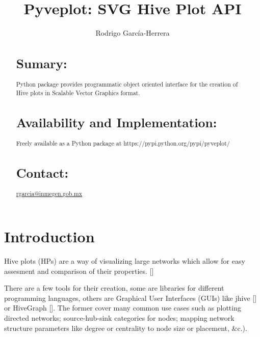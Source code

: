 \documentclass{bioinfo}
\begin{document}

\title[short Title]{Pyveplot: SVG Hive Plot API}
\author[]{Rodrigo Garc\'ia-Herrera}
\address{Department of Bioinformatics, National Institute of Genomic
  Medicine, Periferico Sur 4809, Mexico City 14610}



\maketitle

\begin{abstract}

\section{Sumary:}
Python package provides programmatic object oriented interface for the
creation of Hive plots in Scalable Vector Graphics format.
\section{Availability and Implementation:}
Freely available as a Python package at
https://pypi.python.org/pypi/pyveplot/

\section{Contact:} \href{rgarcia@inmegen.gob.mx}{rgarcia@inmegen.gob.mx}
\end{abstract}

\section{Introduction}

Hive plots (HPs) are a way of visualizing large networks which allow
for easy assesment and comparison of their properties.
[\cite{krzywinski2012hive}]

There are a few tools for their creation, some are libraries for
different programming languages, others are Graphical User Interfaces
(GUIs) like jhive [\cite{jhive}] or HiveGraph [\cite{hivegraph}]. The
former cover many common use cases such as plotting directed networks;
source-hub-sink categories for nodes; mapping network structure
parameters like degree or centrality to node size or placement,
\&c.).
\end{document}
